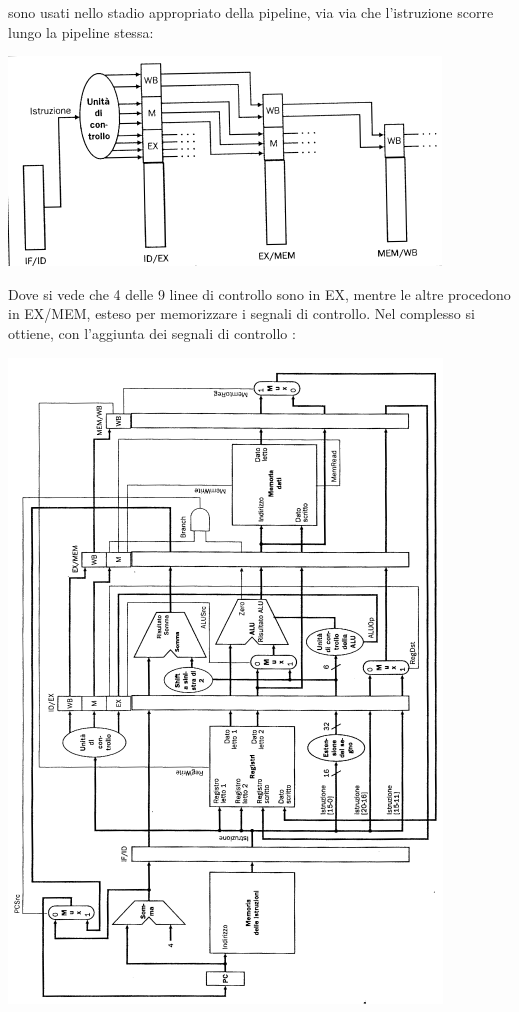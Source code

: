 \documentclass[a4paper,12pt, oneside]{book}
\begin{document}
sono usati nello stadio appropriato della pipeline, via via che
l'istruzione scorre lungo la pipeline stessa:
\begin{center}
  \includegraphics[scale = 0.7]{img/pipec5.png}
\end{center}
Dove si vede che 4 delle 9 linee di controllo sono in EX, mentre le
altre procedono in EX/MEM, esteso per memorizzare i segnali di
controllo.
\newpage
Nel complesso si ottiene, con l'aggiunta dei segnali di controllo
:
\begin{center}
  \includegraphics[scale = 0.8]{img/pipec6.png}
\end{center}
\end{document}
